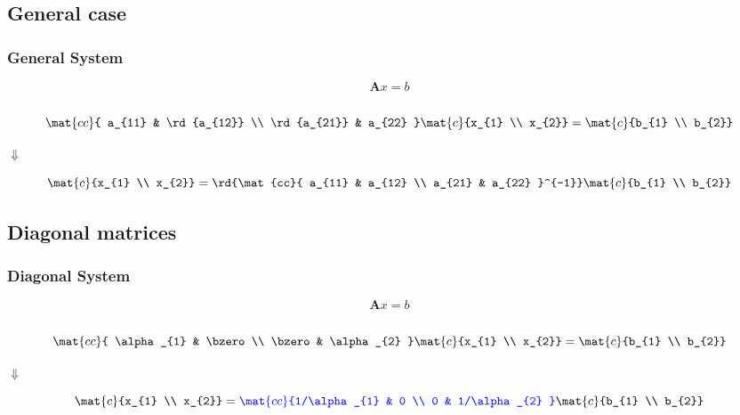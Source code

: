 \documentclass[handout]{beamer}
\begin{document}
\subsection{General case}

\begin{frame}      %
\frametitle{General System}
	$$
	\mathbf{A} x = b
	$$\\[10pt]
  $$
  \mat{cc}{ a_{11} & \rd{a_{12}} \\ \rd{a_{21}} & a_{22} }
  \mat{c}{x_{1} \\ x_{2}} =
  \mat{c}{b_{1} \\ b_{2}}
  $$
  \begin{center}
  $\Downarrow$
  \end{center}
  $$
  \mat{c}{x_{1} \\ x_{2}} = 
  {\rd{\mat{cc}{ a_{11} & a_{12} \\ a_{21} & a_{22} }^{-1}}}
  \mat{c}{b_{1} \\ b_{2}}
  $$
  \onedot
\end{frame}


\subsection{Diagonal matrices}
\begin{frame}      %
\frametitle{Diagonal System}
	$$
	\mathbf{A} x = b
	$$\\[10pt]
  $$
  \mat{cc}{ \alpha_{1} & \bzero \\ \bzero & \alpha_{2} }
  \mat{c}{x_{1} \\ x_{2}} =
  \mat{c}{b_{1} \\ b_{2}}
  $$
  \begin{center}
  $\Downarrow$
  \end{center}
  $$
  \mat{c}{x_{1} \\ x_{2}} = 
  {\color{blue}{\mat{cc}{1/\alpha_{1} & 0 \\ 0 & 1/\alpha_{2} }}}
  \mat{c}{b_{1} \\ b_{2}}
  $$
\end{frame}
\end{document}
